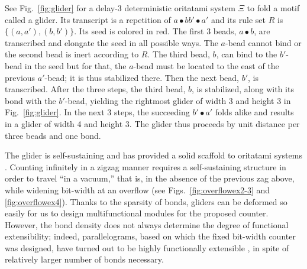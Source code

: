 \documentclass[twocolumn]{svjour3}
\begin{document}
\begin{example}
	See Fig.~\ref{fig:glider} for a delay-3 deterministic oritatami system $\Xi$ to fold a motif called a glider. 
	Its transcript is a repetition of $a \bullet b b' \bullet a'$ and its rule set $R$ is $\{(a, a'), (b, b')\}$. 
	Its seed is colored in red. 
	The first 3 beads, $a \bullet b$, are transcribed and elongate the seed in all possible ways. 
	The $a$-bead cannot bind or the second bead is inert according to $R$. 
	The third bead, $b$, can bind to the $b'$-bead in the seed but for that, the $a$-bead must be located to the east of the previous $a'$-bead; it is thus stabilized there. 
	Then the next bead, $b'$, is transcribed. 
	After the three steps, the third bead, $b$, is stabilized, along with its bond with the $b'$-bead, yielding the rightmost glider of width 3 and height 3 in Fig.~\ref{fig:glider}. 
	In the next 3 steps, the succeeding $b' \bullet a'$ folds alike and results in a glider of width 4 and height 3. 
	The glider thus proceeds by unit distance per three beads and one bond.
	
	The glider is self-sustaining and has provided a solid scaffold to oritatami systems \cite{DemaineHOPRSST2018,ElonenBachelor2016,GeMeScSe2018,HanKim2018,PchelinaSSU2020}. 
	Counting infinitely in a zigzag manner requires a self-sustaining structure in order to travel ``in a vacuum,'' that is, in the absence of the previous zag above, while widening bit-width at an overflow (see Figs.~\ref{fig:overflowex2-3} and \ref{fig:overflowex4}).  
	Thanks to the sparsity of bonds, gliders can be deformed so easily for us to design multifunctional modules for the proposed counter. 
	However, the bond density does not always determine the degree of functional extensibility; indeed, parallelograms, based on which the fixed bit-width counter \cite{GeMeScSe2019} was designed, have turned out to be highly functionally extensible \cite{GeMeScSe2018,PchelinaSSU2020}, in spite of relatively larger number of bonds necessary. 
	
\end{example}
\end{document}
